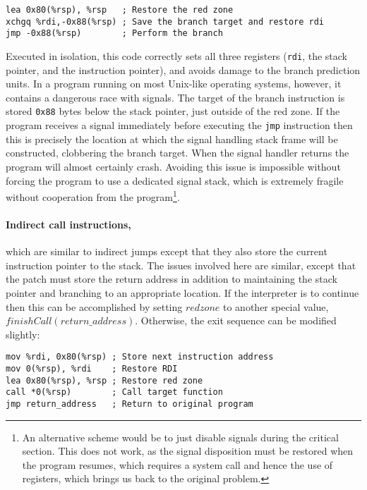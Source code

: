 \begin{verbatim}
lea 0x80(%rsp), %rsp   ; Restore the red zone
xchgq %rdi,-0x88(%rsp) ; Save the branch target and restore rdi
jmp -0x88(%rsp)        ; Perform the branch
\end{verbatim}

Executed in isolation, this code correctly sets all three registers
(\verb|rdi|, the stack pointer, and the instruction pointer), and
avoids damage to the branch prediction units.  In a program running on
most Unix-like operating systems, however, it contains a dangerous
race with signals.  The target of the branch instruction is stored
\verb|0x88| bytes below the stack pointer, just outside of the red
zone.  If the program receives a signal immediately before executing
the \verb|jmp| instruction then this is precisely the location at
which the signal handling stack frame will be constructed, clobbering
the branch target.  When the signal handler returns the program will
almost certainly crash.  Avoiding this issue is impossible without
forcing the program to use a dedicated signal stack, which is
extremely fragile without cooperation from the program\footnote{An
  alternative scheme would be to just disable signals during the
  critical section.  This does not work, as the signal disposition
  must be restored when the program resumes, which requires a system
  call and hence the use of registers, which brings us back to the
  original problem.}.


\paragraph{Indirect call instructions,} which are similar to indirect jumps
except that they also store the current instruction pointer to the
stack.  The issues involved here are similar, except that the patch
must store the return address in addition to maintaining the stack
pointer and branching to an appropriate location.  If the interpreter
is to continue then this can be accomplished by setting $redzone$ to
another special value, $finishCall(return\_address)$.  Otherwise,
the exit sequence can be modified slightly:

\begin{verbatim}
mov %rdi, 0x80(%rsp) ; Store next instruction address
mov 0(%rsp), %rdi    ; Restore RDI
lea 0x80(%rsp), %rsp ; Restore red zone
call *0(%rsp)        ; Call target function
jmp return_address   ; Return to original program
\end{verbatim}

